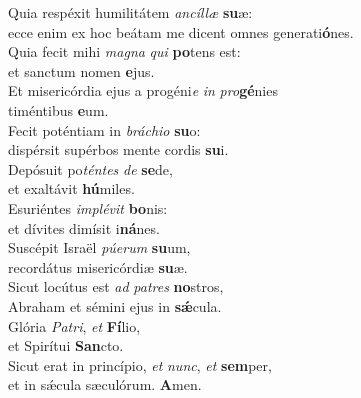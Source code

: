 \oddverse Quia respéxit humilitátem \textit{an}\textit{cíl}\textit{læ} \textbf{su}æ:~\*\\
\oddverse ecce enim ex hoc beátam me dicent omnes generati\textbf{ó}nes.\\
\evenverse Quia fecit mihi \textit{ma}\textit{gna} \textit{qui} \textbf{po}tens est:~\*\\
\evenverse et sanctum nomen \textbf{e}jus.\\
\oddverse Et misericórdia ejus a progéni\textit{e} \textit{in} \textit{pro}\textbf{gé}nies~\*\\
\oddverse timéntibus \textbf{e}um.\\
\evenverse Fecit poténtiam in \textit{brá}\textit{chi}\textit{o} \textbf{su}o:~\*\\
\evenverse dispérsit supérbos mente cordis \textbf{su}i.\\
\oddverse Depósuit po\textit{tén}\textit{tes} \textit{de} \textbf{se}de,~\*\\
\oddverse et exaltávit \textbf{hú}miles.\\
\evenverse Esuriéntes \textit{im}\textit{plé}\textit{vit} \textbf{bo}nis:~\*\\
\evenverse et dívites dimísit i\textbf{ná}nes.\\
\oddverse Suscépit Israël \textit{pú}\textit{e}\textit{rum} \textbf{su}um,~\*\\
\oddverse recordátus misericórdiæ \textbf{su}æ.\\
\evenverse Sicut locútus est \textit{ad} \textit{pa}\textit{tres} \textbf{no}stros,~\*\\
\evenverse Abraham et sémini ejus in \textbf{sǽ}cula.\\
\oddverse Glória \textit{Pa}\textit{tri}, \textit{et} \textbf{Fí}lio,~\*\\
\oddverse et Spirítui \textbf{San}cto.\\
\evenverse Sicut erat in princípio, \textit{et} \textit{nunc}, \textit{et} \textbf{sem}per,~\*\\
\evenverse et in sǽcula sæculórum. \textbf{A}men.\\
